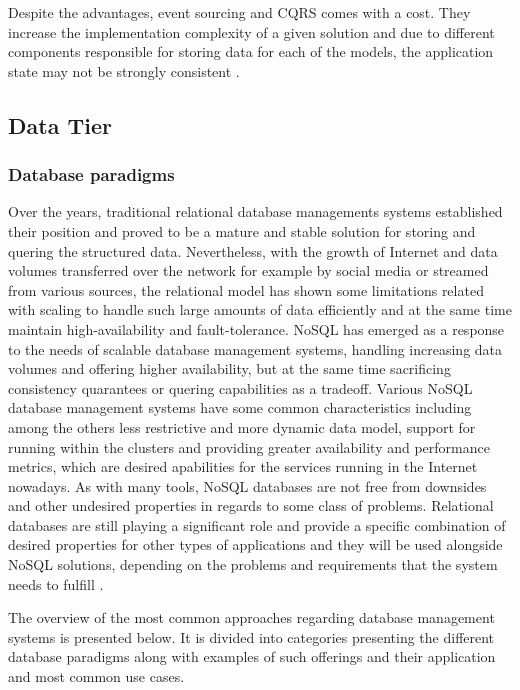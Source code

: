 Despite the advantages, event sourcing and CQRS comes with a cost. They increase the implementation complexity of a given solution and due to different components responsible for storing data for each of the models, the application state may not be strongly consistent \cite{MicroservicesArchitecture}.

\subsection{Data Tier}

\subsubsection{Database paradigms} \label{chapter:database-paradigms}

Over the years, traditional relational database managements systems established their position and proved to be a mature and stable solution for storing and quering the structured data. Nevertheless, with the growth of Internet and data volumes transferred over the network for example by social media or streamed from various sources, the relational model has shown some limitations related with scaling to handle such large amounts of data efficiently and at the same time maintain high-availability and fault-tolerance. NoSQL has emerged as a response to the needs of scalable database management systems, handling increasing data volumes and offering higher availability, but at the same time sacrificing consistency quarantees or quering capabilities as a tradeoff. Various NoSQL database management systems have some common characteristics including among the others less restrictive and more dynamic data model, support for running within the clusters and providing greater availability and performance metrics, which are desired apabilities for the services running in the Internet nowadays. As with many tools, NoSQL databases are not free from downsides and other undesired properties in regards to some class of problems. Relational databases are still playing a significant role and provide a specific combination of desired properties for other types of applications and they will be used alongside NoSQL solutions, depending on the problems and requirements that the system needs to fulfill \cite{FowlerNoSQL}.

The overview of the most common approaches regarding database management systems is presented below. It is divided into categories presenting the different database paradigms along with examples of such offerings and their application and most common use cases.

